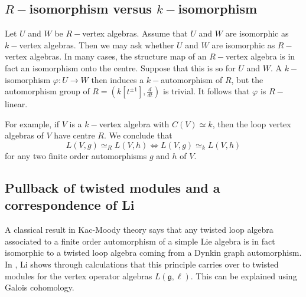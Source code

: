 \documentclass{article}
\newtheorem{thm}{Theorem}[section]
\theoremstyle{definition}
\def\Aut{\ensuremath{\operatorname{Aut}}}
\def\fg{\ensuremath{\mathfrak{g}}}
\begin{document}

\subsection{$R-$isomorphism versus $k-$isomorphism}

Let $U$ and $W$ be $R-$vertex algebras. Assume that $U$ and $W$ are isomorphic as $k-$vertex algebras. Then we may ask whether $U$ and $W$ are isomorphic as $R-$vertex algebras. 
In many cases, the structure map of an $R-$vertex algebra is in fact an isomorphism onto the centre. Suppose that this is so for $U$ and $W$. 
A $k-$isomorphism $\varphi \colon U \to W$ then induces a $k-$automorphism of $R$, but the automorphism group of $R = (k[t^{\pm 1}], \frac{d}{dt})$ is trivial. It follows that $\varphi$ is $R-$linear.

For example, if $V$ is a $k-$vertex algebra with $C(V) \simeq k$, then the loop vertex algebras of $V$ have centre $R$. We conclude that 
\[ L(V,g) \simeq_R L(V,h) \iff L(V,g) \simeq_k L(V,h) \]
for any two finite order automorphisms $g$ and $h$ of $V$.


\subsection{Pullback of twisted modules and a correspondence of Li} \label{twmodLi}

A classical result in Kac-Moody theory says that any twisted loop algebra associated to a finite order automorphism of a simple Lie algebra is in fact isomorphic to a twisted loop algebra coming from a Dynkin graph automorphism. In \cite{Li1, Li2}, Li shows through calculations that this principle carries over to twisted modules for the vertex operator algebras $L(\fg, \ell)$. This can be explained using Galois cohomology.
\end{document}
